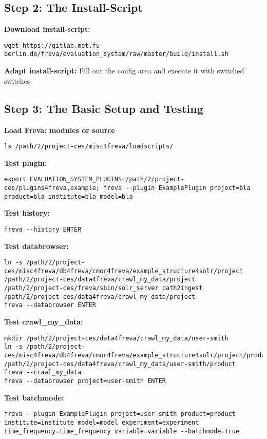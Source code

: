 \documentclass[a4paper,11pt]{ltxdoc}
\begin{document}
\subsection{Step 2: The Install-Script}
\textbf{Download install-script:} 
\begin{lstlisting}
wget https://gitlab.met.fu-berlin.de/freva/evaluation_system/raw/master/build/install.sh \end{lstlisting}
\textbf{Adapt install-script:} Fill out the config area and execute it with switched switches
\subsection{Step 3: The Basic Setup and Testing}
\textbf{Load Freva: modules or source} 
\begin{lstlisting} 
ls /path/2/project-ces/misc4freva/loadscripts/\end{lstlisting}
\textbf{Test plugin:} 
\begin{lstlisting} 
export EVALUATION_SYSTEM_PLUGINS=/path/2/project-ces/plugins4freva,example; freva --plugin ExamplePlugin project=bla product=bla institute=bla model=bla \end{lstlisting}
\textbf{Test history:} 
\begin{lstlisting}
freva --history ENTER \end{lstlisting}
\textbf{Test databrowser:} 
\begin{lstlisting} 
ln -s /path/2/project-ces/misc4freva/db4freva/cmor4freva/example_structure4solr/project /path/2/project-ces/data4freva/crawl_my_data/project
/path/2/project-ces/freva/sbin/solr_server path2ingest /path/2/project-ces/data4freva/crawl_my_data/project
freva --databrowser ENTER\end{lstlisting}
\textbf{Test crawl\_my\_data:} 
\begin{lstlisting} 
mkdir /path/2/project-ces/data4freva/crawl_my_data/user-smith
ln -s /path/2/project-ces/misc4freva/db4freva/cmor4freva/example_structure4solr/project/product /path/2/project-ces/data4freva/crawl_my_data/user-smith/product
freva --crawl_my_data 
freva --databrowser project=user-smith ENTER\end{lstlisting}
\textbf{Test batchmode:} 
\begin{lstlisting} 
freva --plugin ExamplePlugin project=user-smith product=product institute=institute model=model experiment=experiment time_frequency=time_frequency variable=variable --batchmode=True \end{lstlisting}
\end{document}
